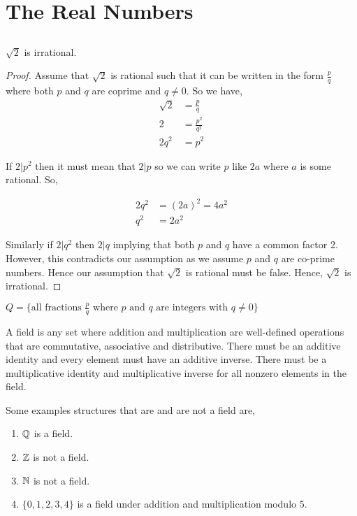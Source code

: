 \chapter{The Real Numbers}
\section{}

\begin{theorem}
  \(\sqrt{2}\) is irrational.
\end{theorem}
\begin{proof}
    Assume that $\sqrt{2}$ is rational such that it can be written in the form $\frac{p}{q}$ where both $p$ and $q$ are coprime and $q \ne 0$. So we have, 
    \begin{align*}
        \sqrt{2} &= \frac{p}{q}\\
                2 &=\frac{p^2}{q^2}\\
                2q^2  &= p^2
    \end{align*}

    If $2 | p^2 $ then it must mean that $2 | p $ so we can write $p$ like $2a$ where $a$ is some rational. So, 
    
    \begin{align*}
        2q^2 &= (2a)^2 = 4a^2\\
             q^2&= 2a^2
    \end{align*}

    Similarly if $2 | q^2$ then $2 | q$ implying that both  $p$ and $q$ have a common factor 2. However, this contradicts our assumption as we assume $p$ and $q$ are co-prime numbers. Hence our assumption that $\sqrt{2}$ is rational must be false. Hence, $\sqrt{2}$ is irrational.
\end{proof}


\begin{definition}
   $Q = \big \{ \text{all fractions $\frac{p}{q}$ where $p$ and $q$ are integers with $q \ne 0$} \big\}$
\end{definition}

\begin{definition}[Field]
    A field is any set where   addition and multiplication are well-defined operations that are commutative, associative and distributive. There must be an additive identity and every element must have an additive inverse. There must be a multiplicative identity and multiplicative inverse for all nonzero elements in the field. 
\end{definition}
\begin{eg}
    Some examples structures that are and are not a field are,
    \begin{enumerate}
        \item $\mathbb{Q}$ is a field.
        \item $\mathbb{Z}$ is not a field.
        \item $\mathbb{N}$  is not a field.
        \item $\{0,1,2,3,4\}$ is a field under addition and multiplication modulo  $5$.
    \end{enumerate}
\end{eg}


